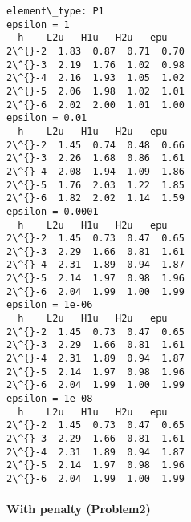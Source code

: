 \documentclass[11pt]{article}
\begin{document}
    \begin{Verbatim}[commandchars=\\\{\}]
element\_type: P1
epsilon = 1
  h    L2u   H1u   H2u   epu
2\^{}-2  1.83  0.87  0.71  0.70
2\^{}-3  2.19  1.76  1.02  0.98
2\^{}-4  2.16  1.93  1.05  1.02
2\^{}-5  2.06  1.98  1.02  1.01
2\^{}-6  2.02  2.00  1.01  1.00
epsilon = 0.01
  h    L2u   H1u   H2u   epu
2\^{}-2  1.45  0.74  0.48  0.66
2\^{}-3  2.26  1.68  0.86  1.61
2\^{}-4  2.08  1.94  1.09  1.86
2\^{}-5  1.76  2.03  1.22  1.85
2\^{}-6  1.82  2.02  1.14  1.59
epsilon = 0.0001
  h    L2u   H1u   H2u   epu
2\^{}-2  1.45  0.73  0.47  0.65
2\^{}-3  2.29  1.66  0.81  1.61
2\^{}-4  2.31  1.89  0.94  1.87
2\^{}-5  2.14  1.97  0.98  1.96
2\^{}-6  2.04  1.99  1.00  1.99
epsilon = 1e-06
  h    L2u   H1u   H2u   epu
2\^{}-2  1.45  0.73  0.47  0.65
2\^{}-3  2.29  1.66  0.81  1.61
2\^{}-4  2.31  1.89  0.94  1.87
2\^{}-5  2.14  1.97  0.98  1.96
2\^{}-6  2.04  1.99  1.00  1.99
epsilon = 1e-08
  h    L2u   H1u   H2u   epu
2\^{}-2  1.45  0.73  0.47  0.65
2\^{}-3  2.29  1.66  0.81  1.61
2\^{}-4  2.31  1.89  0.94  1.87
2\^{}-5  2.14  1.97  0.98  1.96
2\^{}-6  2.04  1.99  1.00  1.99
    \end{Verbatim}

    \paragraph{With penalty (Problem2)}\label{with-penalty-problem2}
\end{document}

